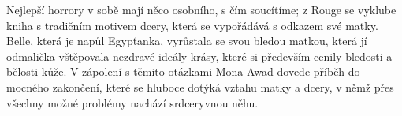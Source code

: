 \documentclass{article}
\begin{document}
Nejlepší horrory v sobě mají něco osobního, s čím soucítíme; z Rouge se vyklube kniha s tradičním motivem dcery, která se vypořádává s odkazem své matky. Belle, která je napůl Egypťanka, vyrůstala se svou bledou matkou, která jí odmalička vštěpovala nezdravé ideály krásy, které si především cenily bledosti a bělosti kůže. V zápolení s těmito otázkami Mona Awad dovede příběh do mocného zakončení, které se hluboce dotýká vztahu matky a dcery, v němž přes všechny možné problémy nachází srdceryvnou něhu.     
\end{document}
